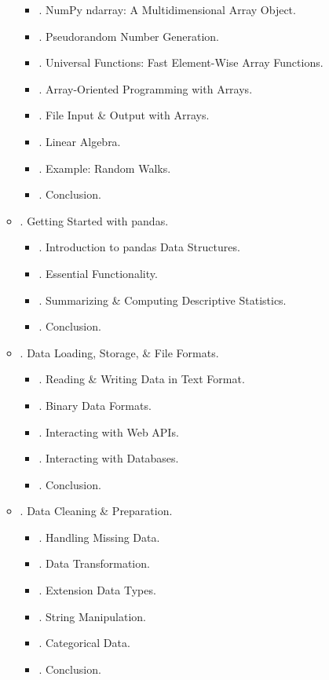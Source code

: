\documentclass{article}
\begin{document}
\begin{enumerate}
\begin{itemize}
		\begin{itemize}
			\item {. NumPy ndarray: A Multidimensional Array Object.}
			\item {. Pseudorandom Number Generation.}
			\item {. Universal Functions: Fast Element-Wise Array Functions.}
			\item {. Array-Oriented Programming with Arrays.}
			\item {. File Input \& Output with Arrays.}
			\item {. Linear Algebra.}
			\item {. Example: Random Walks.}
			\item {. Conclusion.}
		\end{itemize}
		\item {. Getting Started with pandas.}
		\begin{itemize}
			\item {. Introduction to pandas Data Structures.}
			\item {. Essential Functionality.}
			\item {. Summarizing \& Computing Descriptive Statistics.}
			\item {. Conclusion.}
		\end{itemize}
		\item {. Data Loading, Storage, \& File Formats.}
		\begin{itemize}
			\item {. Reading \& Writing Data in Text Format.}
			\item {. Binary Data Formats.}
			\item {. Interacting with Web APIs.}
			\item {. Interacting with Databases.}
			\item {. Conclusion.}
		\end{itemize}
		\item {. Data Cleaning \& Preparation.}
		\begin{itemize}
			\item {. Handling Missing Data.}
			\item {. Data Transformation.}
			\item {. Extension Data Types.}
			\item {. String Manipulation.}
			\item {. Categorical Data.}
			\item {. Conclusion.}

\end{itemize}
\end{itemize}
\end{enumerate}
\end{document}
